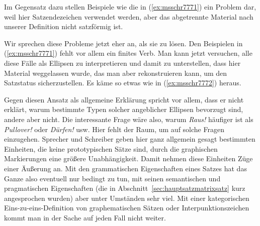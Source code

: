 Im Gegensatz dazu stellen Beispiele wie die in (\ref{ex:msschr7771}) ein Problem dar, weil hier Satzendezeichen verwendet werden, aber das abgetrennte Material nach unserer Definition nicht satzförmig ist.

\begin{exe}
  \ex\label{ex:msschr7771}
  \begin{xlist}
  \end{xlist}
\end{exe}

Wir sprechen diese Probleme jetzt eher an, als sie zu lösen.
Den Beispielen in (\ref{ex:msschr7771}) fehlt vor allem ein finites Verb.
Man kann jetzt versuchen, alle diese Fälle als Ellipsen zu interpretieren und damit zu unterstellen, dass hier Material weggelassen wurde, das man aber rekonstruieren kann, um den Satzstatus sicherzustellen.
Es käme so etwas wie in (\ref{ex:msschr7772}) heraus.

\begin{exe}
  \ex\label{ex:msschr7772}
  \begin{xlist}
  \end{xlist}
\end{exe}

Gegen diesen Ansatz als allgemeine Erklärung spricht vor allem, dass er nicht erklärt, warum bestimmte Typen solcher angeblicher Ellipsen bevorzugt sind, andere aber nicht.
Die interessante Frage wäre also, warum \textit{Raus!} häufiger ist als \textit{Pullover!} oder \textit{Dürfen!} usw.
Hier fehlt der Raum, um auf solche Fragen einzugehen.
Sprecher und Schreiber geben hier ganz allgemein gesagt bestimmten Einheiten, die keine prototypischen Sätze sind, durch die graphischen Markierungen eine größere Unabhängigkeit.
Damit nehmen diese Einheiten Züge einer Äußerung an.
Mit den grammatischen Eigenschaften eines Satzes hat das Ganze also eventuell nur bedingt zu tun, mit seinen semantischen und pragmatischen Eigenschaften (die in Abschnitt~\ref{sec:hauptsatzmatrixsatz} kurz angesprochen wurden) aber unter Umständen sehr viel.
Mit einer kategorischen Eins-zu-eins-Definition von graphematischen Sätzen oder Interpunktionszeichen kommt man in der Sache auf jeden Fall nicht weiter.

